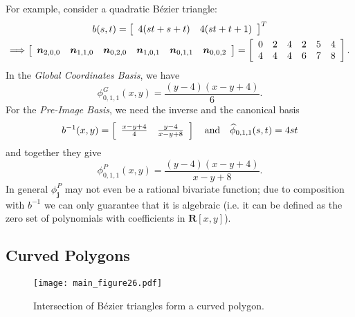 \documentclass[oneside, reqno]{amsart}
\theoremstyle{definition}
\newcommand{\reals}{\mathbf{R}}
\begin{document}
\noindent For example, consider a quadratic B\'{e}zier triangle:
\begin{gather}
b(s, t) = \left[ \begin{array}{c c}
    4 (s t + s + t) & 4 (s t + t + 1)
  \end{array}\right]^T \\
\Longrightarrow
\left[ \begin{array}{c c c c c c}
    \bm{n}_{2, 0, 0} &
    \bm{n}_{1, 1, 0} &
    \bm{n}_{0, 2, 0} &
    \bm{n}_{1, 0, 1} &
    \bm{n}_{0, 1, 1} &
    \bm{n}_{0, 0, 2}
  \end{array}\right] = \left[ \begin{array}{c c c c c c}
    0 & 2 & 4 & 2 & 5 & 4 \\
    4 & 4 & 4 & 6 & 7 & 8
  \end{array}\right].
\end{gather}
In the \emph{Global Coordinates Basis}, we have
\begin{equation}
\phi^{G}_{0, 1, 1}(x, y) = \frac{(y - 4) (x - y + 4)}{6}.
\end{equation}
For the \emph{Pre-Image Basis}, we need the inverse
and the canonical basis
\begin{equation}
b^{-1}(x, y) = \left[ \begin{array}{c c}
    \frac{x - y + 4}{4} & \frac{y - 4}{x - y + 8}
  \end{array}\right] \quad \text{and} \quad
\widehat{\phi}_{0, 1, 1}(s, t) = 4 s t
\end{equation}
and together they give
\begin{equation}
\phi^{P}_{0, 1, 1}(x, y) = \frac{(y - 4) (x - y + 4)}{x - y + 8}.
\end{equation}
In general \(\phi_{\bm{j}}^P\) may not even be a rational bivariate
function; due to composition with \(b^{-1}\) we can only guarantee that
it is algebraic (i.e. it can be defined as the zero set of polynomials
with coefficients in \(\reals\left[x, y\right]\)).

\subsection{Curved Polygons}\label{subsec:curved-polygons}

\begin{figure}
  \texttt{[image: main\_figure26.pdf]}
  \centering
  \captionsetup{width=.75\linewidth}
  \caption{Intersection of B\'{e}zier triangles form a curved polygon.}
  \label{fig:bezier-triangle-intersect}
\end{figure}
\end{document}
